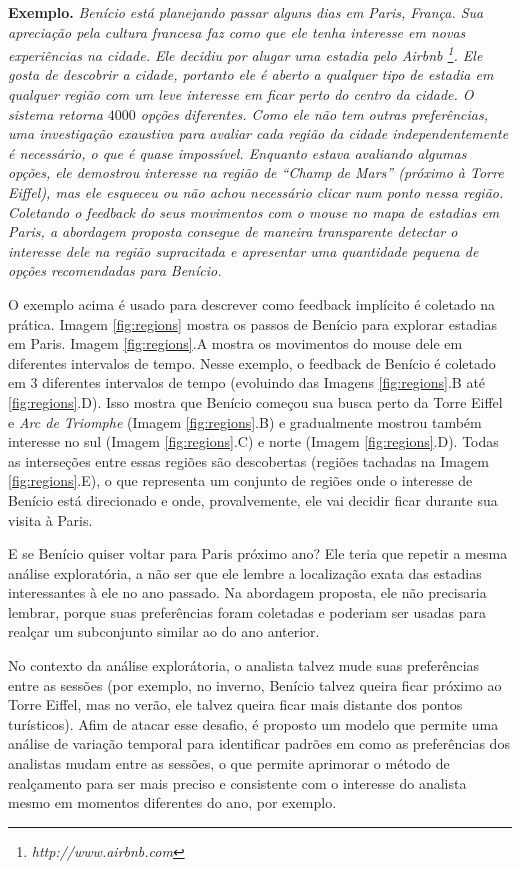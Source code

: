 {\bf Exemplo.} {\em Benício está planejando passar alguns dias em Paris, França. Sua apreciação pela cultura francesa faz como que ele tenha interesse em novas experiências na cidade. Ele decidiu por alugar uma estadia pelo Airbnb \footnote{\it http://www.airbnb.com}. Ele gosta de descobrir a cidade, portanto ele é aberto a qualquer tipo de estadia em qualquer região com um leve interesse em ficar perto do centro da cidade. O sistema retorna $4000$ opções diferentes. Como ele não tem outras preferências, uma investigação exaustiva para avaliar cada região da cidade independentemente é necessário, o que é quase impossível. Enquanto estava avaliando algumas opções, ele demostrou interesse na região de  ``Champ de Mars'' (próximo à Torre Eiffel), mas ele esqueceu ou não achou necessário clicar num ponto nessa região. Coletando o feedback do seus movimentos com o mouse no mapa de estadias em Paris, a abordagem proposta consegue de maneira transparente detectar o interesse dele na região supracitada e apresentar uma quantidade pequena de opções recomendadas para Benício.}

O exemplo acima é usado para descrever como feedback implícito é coletado na prática. Imagem \ref{fig:regions} mostra os passos de Benício para explorar estadias em Paris. Imagem \ref{fig:regions}.A mostra os movimentos do mouse dele em diferentes intervalos de tempo. Nesse exemplo, o feedback de Benício é coletado em 3 diferentes intervalos de tempo (evoluindo das Imagens \ref{fig:regions}.B até \ref{fig:regions}.D). Isso mostra que Benício começou sua busca perto da Torre Eiffel e {\em Arc de Triomphe} (Imagem \ref{fig:regions}.B) e gradualmente mostrou também interesse no sul (Imagem \ref{fig:regions}.C) e norte (Imagem \ref{fig:regions}.D). Todas as interseções entre essas regiões são descobertas (regiões tachadas na Imagem \ref{fig:regions}.E), o que representa um conjunto de regiões onde o interesse de Benício está direcionado e onde, provalvemente, ele vai decidir ficar durante sua visita à Paris.

E se Benício quiser voltar para Paris próximo ano? Ele teria que repetir a mesma análise exploratória, a não ser que ele lembre a localização exata das estadias interessantes à ele no ano passado. Na abordagem proposta, ele não precisaria lembrar, porque suas preferências foram coletadas e poderiam ser usadas para realçar um subconjunto similar ao do ano anterior.

No contexto da análise explorátoria, o analista talvez mude suas preferências entre as sessões (por exemplo, no inverno, Benício talvez queira ficar próximo ao Torre Eiffel, mas no verão, ele talvez queira ficar mais distante dos pontos turísticos). Afim de atacar esse desafio, é proposto um modelo que permite uma análise de variação temporal para identificar padrões em como as preferências dos analistas mudam entre as sessões, o que permite aprimorar o método de realçamento para ser mais preciso e consistente com o interesse do analista mesmo em momentos diferentes do ano, por exemplo.

